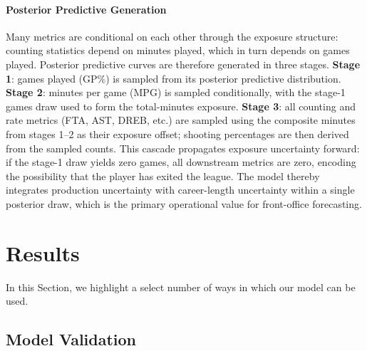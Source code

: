 \documentclass[aoas]{imsart}
\begin{document}
\paragraph{Posterior Predictive Generation}
Many metrics are conditional on each other through the exposure structure: counting statistics depend on minutes played, which in turn depends on games played.  Posterior predictive curves are therefore generated in three stages.  \textbf{Stage 1}: games played (GP\%) is sampled from its posterior predictive distribution.  \textbf{Stage 2}: minutes per game (MPG) is sampled conditionally, with the stage-1 games draw used to form the total-minutes exposure.  \textbf{Stage 3}: all counting and rate metrics (FTA, AST, DREB, etc.) are sampled using the composite minutes from stages 1--2 as their exposure offset; shooting percentages are then derived from the sampled counts.  This cascade propagates exposure uncertainty forward: if the stage-1 draw yields zero games, all downstream metrics are zero, encoding the possibility that the player has exited the league.  The model thereby integrates production uncertainty with career-length uncertainty within a single posterior draw, which is the primary operational value for front-office forecasting.

\section{Results}
\label{sec:results}
In this Section, we highlight a select number of ways in which our model can be used.

\subsection{Model Validation}
\label{sec:validation}

\end{document}
